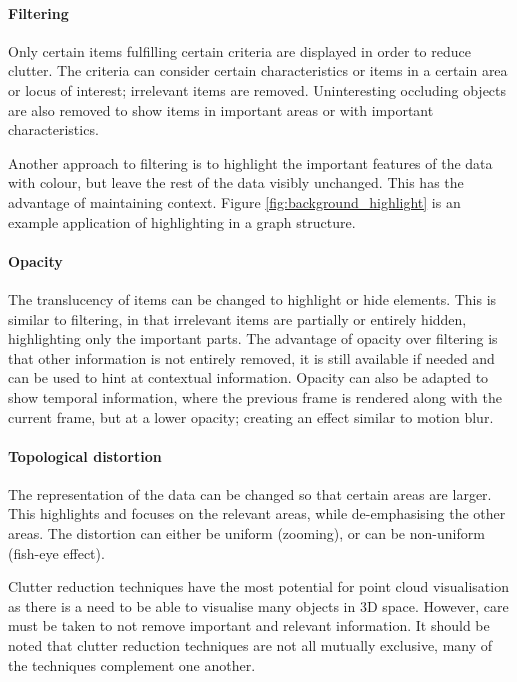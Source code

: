 \paragraph{Filtering} Only certain items fulfilling certain criteria are
displayed in order to reduce clutter. The criteria can consider certain
characteristics or items in a certain area or locus of interest; irrelevant
items are removed. Uninteresting occluding objects are also removed to show
items in important areas or with important characteristics.

Another approach to filtering is to highlight the important features of the
data with colour, but leave the rest of the data visibly unchanged. This has
the advantage of maintaining context. Figure \ref{fig:background_highlight} is
an example application of highlighting in a graph structure.

\paragraph{Opacity} The translucency of items can be changed to highlight or
hide elements. This is similar to filtering, in that irrelevant items are
partially or entirely hidden, highlighting only the important parts. The
advantage of opacity over filtering is that other information is not entirely
removed, it is still available if needed and can be used to hint at contextual
information. Opacity can also be adapted to show temporal information, where
the previous frame is rendered along with the current frame, but at a lower
opacity; creating an effect similar to motion blur.

\paragraph{Topological distortion} The representation of the data can be
changed so that certain areas are larger.  This highlights and focuses on the
relevant areas, while de-emphasising the other areas. The distortion can either
be uniform (zooming), or can be non-uniform (fish-eye effect).

Clutter reduction techniques have the most potential for point cloud
visualisation as there is a need to be able to visualise many objects in 3D
space. However, care must be taken to not remove important and relevant
information. It should be noted that clutter reduction techniques are not all
mutually exclusive, many of the techniques complement one another.

